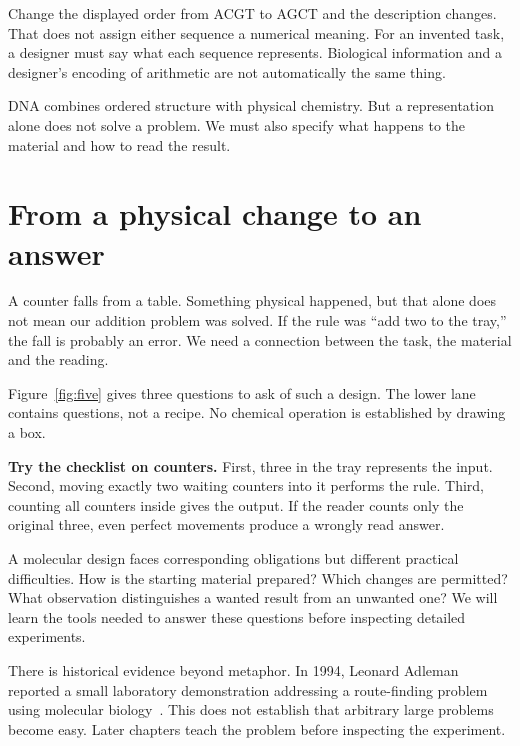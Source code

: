 Change the displayed order from ACGT to AGCT and the description changes. That does not assign either sequence a numerical meaning. For an invented task, a designer must say what each sequence represents. Biological information and a designer's encoding of arithmetic are not automatically the same thing.

DNA combines ordered structure with physical chemistry. But a representation alone does not solve a problem. We must also specify what happens to the material and how to read the result.

\clearpage
\section{From a physical change to an answer}\label{sec:bridge}
A counter falls from a table. Something physical happened, but that alone does not mean our addition problem was solved. If the rule was “add two to the tray,” the fall is probably an error. We need a connection between the task, the material and the reading.

 Figure~\ref{fig:five} gives three questions to ask of such a design. The lower lane contains questions, not a recipe. No chemical operation is established by drawing a box.

\textbf{Try the checklist on counters.} First, three in the tray represents the input. Second, moving exactly two waiting counters into it performs the rule. Third, counting all counters inside gives the output. If the reader counts only the original three, even perfect movements produce a wrongly read answer.

A molecular design faces corresponding obligations but different practical difficulties. How is the starting material prepared? Which changes are permitted? What observation distinguishes a wanted result from an unwanted one? We will learn the tools needed to answer these questions before inspecting detailed experiments.

There is historical evidence beyond metaphor. In 1994, Leonard Adleman reported a small laboratory demonstration addressing a route-finding problem using molecular biology~\cite{adleman}. This does not establish that arbitrary large problems become easy. Later chapters teach the problem before inspecting the experiment.

